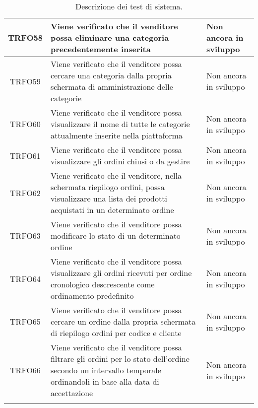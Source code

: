 \begin{longtable}{|c| C{10cm} |C{3cm}|}
   	TRFO58 & Viene verificato che il venditore possa eliminare una categoria precedentemente inserita & Non ancora in sviluppo\\ \hline
    	TRFO59 & Viene verificato che il venditore possa cercare una categoria dalla propria schermata di amministrazione delle categorie & Non ancora in sviluppo\\ \hline
	TRFO60 & Viene verificato che il venditore possa visualizzare il nome di tutte le categorie attualmente inserite nella piattaforma & Non ancora in sviluppo\\ \hline
	TRFO61 & Viene verificato che il venditore possa visualizzare gli ordini chiusi o da gestire & Non ancora in sviluppo\\ \hline
    	TRFO62 & Viene verificato che il venditore, nella schermata riepilogo ordini,  possa visualizzare una lista dei prodotti acquistati in un determinato ordine & Non ancora in sviluppo\\ \hline
    	TRFO63 & Viene verificato che il venditore possa modificare lo stato di un determinato ordine & Non ancora in sviluppo\\ \hline
	TRFO64 & Viene verificato che il venditore possa visualizzare gli ordini ricevuti per ordine cronologico descrescente come ordinamento predefinito & Non ancora in sviluppo\\ \hline
	TRFO65 & Viene verificato che il venditore possa cercare un ordine dalla propria schermata di riepilogo ordini per codice e cliente & Non ancora in sviluppo\\ \hline
    	TRFO66 & Viene verificato che il venditore possa filtrare gli ordini per lo stato dell'ordine secondo un intervallo temporale ordinandoli in base alla data di accettazione & Non ancora in sviluppo\\ 
    	\caption{Descrizione dei test di sistema.}
\end{longtable}

